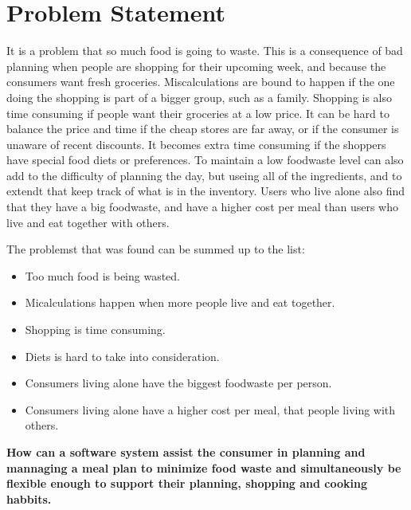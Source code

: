 \chapter{Problem Statement}
It is a problem that so much food is going to waste.
This is a consequence of bad planning when people are shopping for their upcoming week, and because the consumers want fresh groceries.
Miscalculations are bound to happen if the one doing the shopping is part of a bigger group, such as a family.
Shopping is also time consuming if people want their groceries at a low price.
It can be hard to balance the price and time if the cheap stores are far away, or if the consumer is unaware of recent discounts.
It becomes extra time consuming if the shoppers have special food diets or preferences.
To maintain a low foodwaste level can also add to the difficulty of planning the day, but useing all of the ingredients, and to extendt that keep track of what is in the inventory.
Users who live alone also find that they have a big foodwaste, and have a higher cost per meal than users who live and eat together with others.

The problemst that was found can be summed up to the list:

\begin{itemize}
    \item Too much food is being wasted.
    \item Micalculations happen when more people live and eat together.
    \item Shopping is time consuming.
    \item Diets is hard to take into consideration.
    \item Consumers living alone have the biggest foodwaste per person.
    \item Consumers living alone have a higher cost per meal, that people living with others.
\end{itemize}

\textbf{How can a software system assist the consumer in planning and mannaging a meal plan to minimize food waste and simultaneously be flexible enough to support their planning, shopping and cooking habbits.}